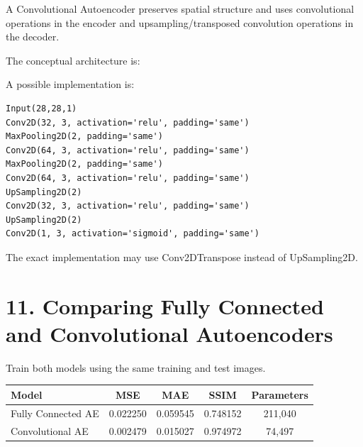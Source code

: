 \documentclass[10pt]{article}
\begin{document}
A Convolutional Autoencoder preserves spatial structure and uses convolutional
operations in the encoder and upsampling/transposed convolution operations
in the decoder.

The conceptual architecture is:

\begin{center}
\end{center}

A possible implementation is:

\begin{verbatim}
Input(28,28,1)
Conv2D(32, 3, activation='relu', padding='same')
MaxPooling2D(2, padding='same')
Conv2D(64, 3, activation='relu', padding='same')
MaxPooling2D(2, padding='same')
Conv2D(64, 3, activation='relu', padding='same')
UpSampling2D(2)
Conv2D(32, 3, activation='relu', padding='same')
UpSampling2D(2)
Conv2D(1, 3, activation='sigmoid', padding='same')
\end{verbatim}

The exact implementation may use Conv2DTranspose instead of UpSampling2D.

\section*{11. Comparing Fully Connected and Convolutional Autoencoders}

Train both models using the same training and test images.

\begin{center}
\begin{tabular}{|l|c|c|c|c|}
\hline
Model & MSE & MAE & SSIM & Parameters\\
\hline
Fully Connected AE & 0.022250 & 0.059545 & 0.748152 & 211{,}040\\
Convolutional AE & 0.002479 & 0.015027 & 0.974972 & 74{,}497\\
\hline
\end{tabular}
\end{center}
\end{document}

